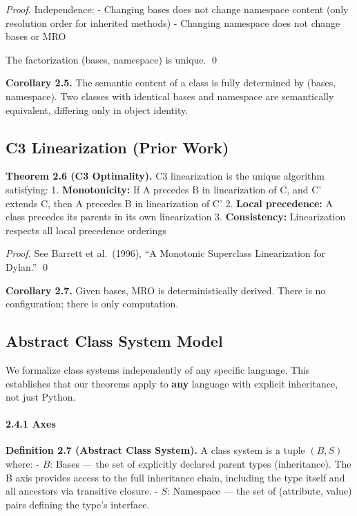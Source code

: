 \emph{Proof.} Independence: - Changing bases does not change namespace
content (only resolution order for inherited methods) - Changing
namespace does not change bases or MRO

The factorization (bases, namespace) is unique. \qed

\textbf{Corollary 2.5.} The semantic content of a class is fully
determined by (bases, namespace). Two classes with identical bases and
namespace are semantically equivalent, differing only in object
identity.

\subsection{C3 Linearization (Prior
Work)}\label{c3-linearization-prior-work}

\textbf{Theorem 2.6 (C3 Optimality).} C3 linearization is the unique
algorithm satisfying: 1. \textbf{Monotonicity:} If A precedes B in
linearization of C, and C' extends C, then A precedes B in linearization
of C' 2. \textbf{Local precedence:} A class precedes its parents in its
own linearization 3. \textbf{Consistency:} Linearization respects all
local precedence orderings

\emph{Proof.} See Barrett et al.~(1996), ``A Monotonic Superclass
Linearization for Dylan.'' \qed

\textbf{Corollary 2.7.} Given bases, MRO is deterministically derived.
There is no configuration; there is only computation.

\subsection{Abstract Class System
Model}\label{abstract-class-system-model}

We formalize class systems independently of any specific language. This
establishes that our theorems apply to \textbf{any} language with
explicit inheritance, not just Python.

\paragraph{2.4.1 Axes}\label{the-two-axis-model}

\textbf{Definition 2.7 (Abstract Class System).} A class system is a
tuple \((B, S)\) where: - \(B\): Bases --- the set of explicitly
declared parent types (inheritance). The B axis provides access to the full inheritance chain, including the type itself and all ancestors via transitive closure. - \(S\): Namespace --- the set of
(attribute, value) pairs defining the type's interface.


